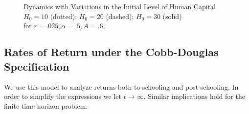 \begin{figure}[H]
    			\centering 
    			\captionsetup{justification=centering}
\caption{Dynamics with Variations in the Initial Level of Human Capital \\ $H_{0} = 10$ (dotted); $H_{0} = 20$ (dashed); $H_{0} = 30$ (solid) \\ for $r = .025, \alpha = .5, A = .6$,}
        \\
        \\
\end{figure}

\subsection{Rates of Return under the Cobb-Douglas Specification}
We use this model to analyze returns both to schooling and post-schooling. In order to simplify the expressions we let $t \rightarrow  \infty$. Similar implications hold for the finite time horizon problem.

